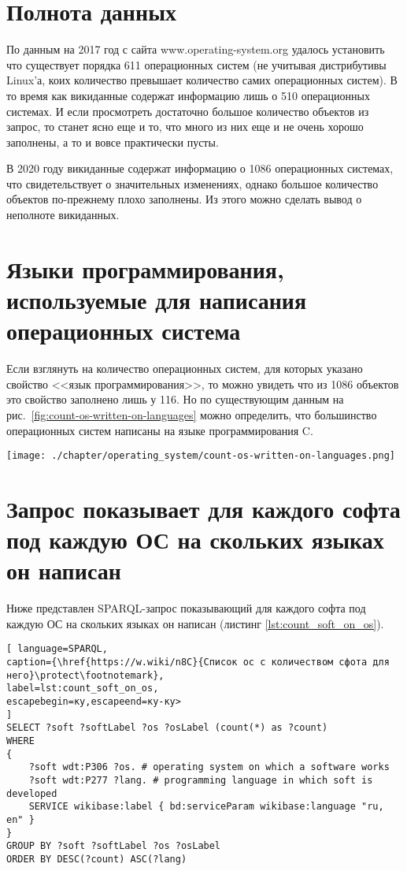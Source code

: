 \section{Полнота данных}
По данным на 2017 год с сайта www.operating-system.org удалось установить что существует порядка 611 операционных систем \cite{list_operating_systems} (не учитывая дистрибутивы Linux'а, коих количество превышает количество самих операционных систем). В то время как викиданные содержат информацию лишь о 510 операционных системах. И если просмотреть достаточно большое количество объектов из запрос, то станет ясно еще и то, что много из них еще и не очень хорошо заполнены, а то и вовсе практически пусты.

В 2020 году викиданные содержат информацию о 1086 операционных системах, что свидетельствует о значительных изменениях, однако большое количество объектов по-прежнему плохо заполнены. Из этого можно сделать вывод о неполноте викиданных.

\section{Языки программирования, используемые для написания операционных система}
Если взглянуть на количество операционных систем, для которых указано свойство <<язык программирования>>, то можно увидеть что из 1086 объектов это свойство заполнено лишь у 116. Но по существующим данным на рис.~\ref{fig:count-os-written-on-languages} можно определить, что большинство операционных систем написаны на языке программирования C. 
\begin{figure*}[h!]
	\texttt{[image: ./chapter/operating\_system/count-os-written-on-languages.png]}
	\caption{Количество операционных систем, написанных на языках программирования (данные на 2020 год.)}
	\label{fig:count-os-written-on-languages}
\end{figure*}


\section{Запрос показывает для каждого софта под каждую ОС на скольких языках он написан}
Ниже представлен SPARQL-запрос показывающий для каждого софта под каждую ОС на скольких языках он написан (листинг \ref{lst:count_soft_on_os}).

\begin{lstlisting}[ language=SPARQL, 
caption={\href{https://w.wiki/n8C}{Список ос с количеством сфота для него}\protect\footnotemark},
label=lst:count_soft_on_os, 
escapebegin=ку,escapeend=ку-ку>
]
SELECT ?soft ?softLabel ?os ?osLabel (count(*) as ?count)
WHERE
{
	?soft wdt:P306 ?os. # operating system on which a software works
	?soft wdt:P277 ?lang. # programming language in which soft is developed
	SERVICE wikibase:label { bd:serviceParam wikibase:language "ru, en" }
}
GROUP BY ?soft ?softLabel ?os ?osLabel
ORDER BY DESC(?count) ASC(?lang)
\end{lstlisting}


